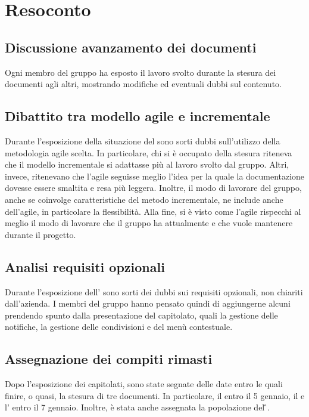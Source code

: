 \newpage




\section{Resoconto}

\subsection{Discussione avanzamento dei documenti}

Ogni membro del gruppo ha esposto il lavoro svolto durante la stesura dei documenti agli altri, mostrando modifiche ed eventuali dubbi sul contenuto. 

\subsection{Dibattito tra modello agile e incrementale}

Durante l'esposizione della situazione del \PdP{} sono sorti dubbi sull'utilizzo della metodologia agile scelta. In particolare, chi si è occupato della stesura riteneva che il modello incrementale si adattasse più al lavoro svolto dal gruppo. Altri, invece, ritenevano che l'agile seguisse meglio l'idea per la quale la documentazione dovesse essere smaltita e resa più leggera. Inoltre, il modo di lavorare del gruppo, anche se coinvolge caratteristiche del metodo incrementale, ne include anche dell'agile, in particolare la flessibilità. Alla fine, si è visto come l'agile rispecchi al meglio il modo di lavorare che il gruppo ha attualmente e che vuole mantenere durante il progetto.

\subsection{Analisi requisiti opzionali}

Durante l'esposizione dell'\AdR{} sono sorti dei dubbi sui requisiti opzionali, non chiariti dall'azienda. I membri del gruppo hanno pensato quindi di aggiungerne alcuni prendendo spunto dalla presentazione del capitolato, quali la gestione delle notifiche, la gestione delle condivisioni e del menù contestuale. 

\subsection{Assegnazione dei compiti rimasti}

Dopo l'esposizione dei capitolati, sono state segnate delle date entro le quali finire, o quasi, la stesura di tre documenti. In particolare, il \PdP{} entro il 5 gennaio, il \PdQ{} e l'\AdR{} entro il 7 gennaio. Inoltre, è stata anche assegnata la popolazione del \G{}.


